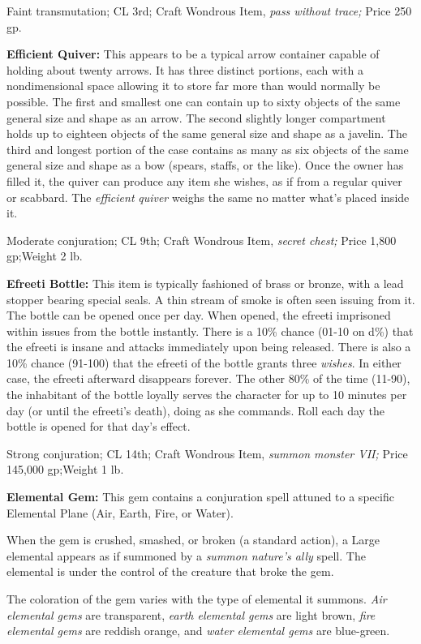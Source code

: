 \documentclass{article}
\begin{document}
Faint transmutation; CL 3rd; Craft Wondrous Item, \textit{pass without trace; }Price 
250 gp.

\textbf{Efficient Quiver:} This appears to be a typical arrow container capable 
of holding about twenty arrows. It has three distinct portions, each with a nondimensional 
space allowing it to store far more than would normally be possible. The first 
and smallest one can contain up to sixty objects of the same general size and shape 
as an arrow. The second slightly longer compartment holds up to eighteen objects 
of the same general size and shape as a javelin. The third and longest portion 
of the case contains as many as six objects of the same general size and shape 
as a bow (spears, staffs, or the like). Once the owner has filled it, the quiver 
can produce any item she wishes, as if from a regular quiver or scabbard. The \textit{efficient} 
\textit{quiver }weighs the same no matter what's placed inside it.

Moderate conjuration; CL 9th; Craft Wondrous Item, \textit{secret chest; }Price 
1,800 gp;Weight 2 lb.

\textbf{Efreeti Bottle: }This item is typically fashioned of brass or bronze, with 
a lead stopper bearing special seals. A thin stream of smoke is often seen issuing 
from it. The bottle can be opened once per day. When opened, the efreeti imprisoned 
within issues from the bottle instantly. There is a 10\% chance (01-10 on d\%) 
that the efreeti is insane and attacks immediately upon being released. There is 
also a 10\% chance (91-100) that the efreeti of the bottle grants three \textit{wishes}. 
In either case, the efreeti afterward disappears forever. The other 80\% of the 
time (11-90), the inhabitant of the bottle loyally serves the character for up 
to 10 minutes per day (or until the efreeti's death), doing as she commands. Roll 
each day the bottle is opened for that day's effect.

Strong conjuration; CL 14th; Craft Wondrous Item, \textit{summon monster VII; }Price 
145,000 gp;Weight 1 lb.

\textbf{Elemental Gem:} This gem contains a conjuration spell attuned to a specific 
Elemental Plane (Air, Earth, Fire, or Water).

When the gem is crushed, smashed, or broken (a standard action), a Large elemental 
appears as if summoned by a \textit{summon nature's ally }spell. The elemental 
is under the control of the creature that broke the gem.

The coloration of the gem varies with the type of elemental it summons. \textit{Air 
elemental gems }are transparent, \textit{earth elemental gems }are light brown, 
\textit{fire elemental gems }are reddish orange, and \textit{water elemental gems 
}are blue-green.
\end{document}
